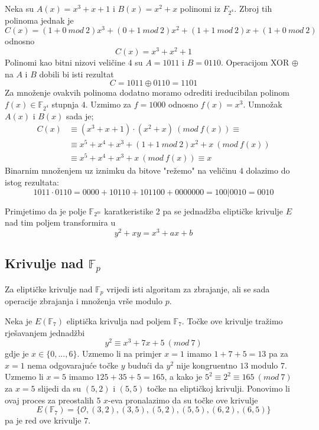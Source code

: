 \documentclass{mathos}
\begin{document}
\begin{primjer}
    Neka su $A(x) = x^3 + x + 1$ i $B(x) = x^2 + x$ polinomi iz $F_{2^4}$. Zbroj tih polinoma jednak je \[C(x) = (1+0\  mod\  2)x^3 + (0+1 \  mod\  2)x^2 + (1+1 \  mod\  2)x + (1+0 \  mod\  2) \] odnosno \[C(x) = x^3 + x^2 + 1\]
    Polinomi kao bitni nizovi veličine $4$ su $A = 1011$ i $B = 0110$. Operacijom XOR $\oplus$ na $A$ i $B$ dobili bi isti rezultat \[C = 1011 \oplus 0110 = 1101\] Za množenje ovakvih polinoma dodatno moramo odrediti ireducibilan polinom $f(x) \in \mathbb{F}_{2^4}$ stupnja $4$. Uzmimo za $f=1000$ odnosno $f(x)=x^3$. Umnožak $A(x)$ i $B(x)$ sada je;
    \[ \begin{split}
        C(x) & \equiv (x^3 + x + 1) \cdot (x^2 + x) \ (mod\  f(x)) \equiv \\
        & \equiv x^5 + x^4 + x^3 + (1+1\  mod\  2)x^2 + x \ (mod\  f(x)) \\
        & \equiv x^5 + x^4 + x^3 + x \  (mod\  f(x)) \equiv x
    \end{split}\]
    Binarnim množenjem uz iznimku da bitove "režemo" na veličinu $4$ dolazimo do istog rezultata:
    \[ 1011 \cdot 0110 = 0000 + 10110 + 101100 + 0000000 = 100|0010 = 0010 \]
\end{primjer}
\begin{nap}
    Primjetimo da je polje $\mathbb{F}_{2^m}$ karatkeristike 2 pa se jednadžba eliptičke krivulje $E$ nad tim poljem transformira u
    \[ y^2 + xy = x^3 + ax + b \]
\end{nap}

\subsection{Krivulje nad $\mathbb{F}_{p}$}

Za eliptičke krivulje nad $\mathbb{F}_p$ vrijedi isti algoritam za zbrajanje, ali se sada operacije zbrajanja i množenja vrše modulo $p$.

\begin{primjer}
    Neka je $E(\mathbb{F}_7)$ eliptička krivulja nad poljem $\mathbb{F}_7$. Točke ove krivulje tražimo rješavanjem jednadžbi
    \[ y^2 \equiv x^3 + 7x + 5 \  (mod\  7) \]
    gdje je $x\in\{0,...,6\}$.
    Uzmemo li na primjer $x = 1$ imamo $1 + 7 + 5 = 13$ pa za $x = 1$ nema odgovarajuće točke $y$ budući da $y^2$ nije kongruentno $13$ modulo $7$.
    Uzmemo li $x = 5$ imamo $125 + 35 + 5 = 165$, a kako je $5^2 \equiv 2^2 \equiv 165 \  (mod \ 7)$ za $x = 5$ slijedi da su $(5, 2)$ i $(5, 5)$ točke na eliptičkoj krivulji.
    Ponovimo li ovaj proces za preostalih $5$ $x$-eva pronalazimo da su točke ove krivulje 
    \[E(\mathbb{F}_7) =  \{ \mathcal{O}, (3, 2), (3, 5), (5, 2), (5, 5), (6, 2), (6, 5)\}\]
    pa je red ove krivulje $7$.
\end{primjer}
\end{document}
